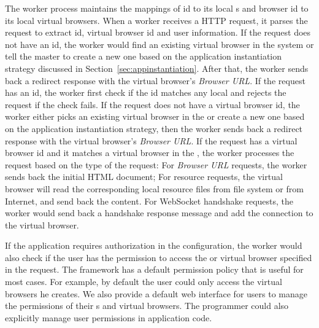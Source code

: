 The worker process maintains the mappings of \appins{} id to its local
\appins{}s and browser id to its local virtual browsers.
When a worker receives a HTTP request, it parses the request to extract
\appins id, virtual browser id and user information. If the request does not
have an \appins id, the worker would find an existing virtual browser in the
system or tell the master to create a new one  based on the application
instantiation strategy discussed in Section~\ref{sec:appinstantiation}. After
that, the worker sends back a redirect response with the virtual browser's
\emph{Browser URL}. If the request has an \appins id, the worker first check
if the id matches any local \appins and rejects the request if the check
fails. If the request does not have a virtual browser id, the worker either
picks an existing virtual browser in the \appins  or create a new one based on
the application instantiation strategy, then the worker sends back a redirect
response with  the virtual browser's \emph{Browser URL}. If the request has a
virtual browser id and it matches a virtual browser in the \appins, the worker
processes the request based on the type of the request: For \emph{Browser URL}
requests, the worker sends back the initial  HTML document; For resource
requests, the virtual browser will read the corresponding local resource files
from file system or from Internet, and send back the content. For WebSocket
handshake requests, the worker would send back a handshake response message
and add the connection to the virtual browser.


If the application requires authorization in the configuration, the
worker would also check if the user has the permission to access the \appins
or virtual browser specified in the request. The framework has a default
permission policy that is useful for most cases. For example, by default the
user could only access the virtual browsers he creates. We also provide a
default web interface for users to manage the permissions of their \appins{}s
and virtual browsers. The programmer could also explicitly manage user
permissions in application code.


